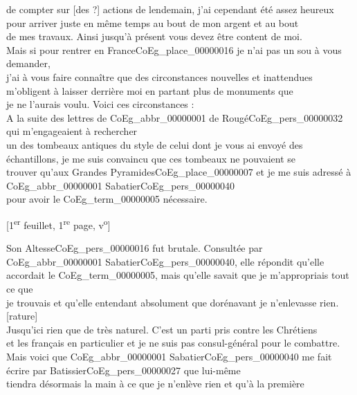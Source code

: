 \documentclass{book}
\begin{document}
de compter sur {[des ?]} actions de lendemain, j’ai cependant été assez heureux\\
pour arriver juste en même temps au bout de mon argent et au bout\\
de mes travaux. Ainsi jusqu’à présent vous devez être content de moi.\\
\indent Mais si pour rentrer en France\gls{CoEg_place_00000016} je n’ai pas un sou à vous demander,\\
j’ai à vous faire connaître que des circonstances nouvelles et inattendues\\
m’obligent à laisser derrière moi en partant plus de monuments que\\
je ne l’aurais voulu. Voici ces circonstances :\\
\indent A la suite des lettres de \gls{CoEg_abbr_00000001} de Rougé\gls{CoEg_pers_00000032} qui m’engageaient à rechercher\\
un des tombeaux antiques du style de celui dont je vous ai envoyé des\\
échantillons, je me suis convaincu que ces tombeaux ne pouvaient se\\
trouver qu’aux Grandes Pyramides\gls{CoEg_place_00000007} et je me suis adressé à \gls{CoEg_abbr_00000001} Sabatier\gls{CoEg_pers_00000040}\\
pour avoir le \gls{CoEg_term_00000005} nécessaire.
{\footnotesize\begin{center} {[1\textsuperscript{er} feuillet, 1\textsuperscript{re} page, v\textsuperscript{o}]}\end{center}}
\indent Son Altesse\gls{CoEg_pers_00000016} fut brutale. Consultée par \gls{CoEg_abbr_00000001} Sabatier\gls{CoEg_pers_00000040}, elle répondit qu’elle\\
accordait le \gls{CoEg_term_00000005}, mais qu’elle savait que je m’appropriais tout ce que\\
je trouvais et qu’elle entendant absolument que dorénavant je n’enlevasse rien. [rature]\\
\indent Jusqu’ici rien que de très naturel. C’est un parti pris contre les Chrétiens\\
et les français en particulier et je ne suis pas consul-général pour le combattre.\\
\indent Mais voici que \gls{CoEg_abbr_00000001} Sabatier\gls{CoEg_pers_00000040} me fait écrire par Batissier\gls{CoEg_pers_00000027} que lui-même\\
tiendra désormais la main à ce que je n’enlève rien et qu’à la première\\
\end{document}
